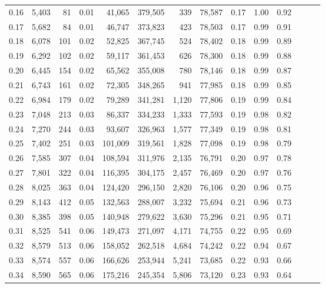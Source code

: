 \begin{tabular}{rrrrrrrrrrrrrr}
0.16 &  5,403 &     81 &  0.01 &   41,065 &  379,505 &     339 &  78,587 &  0.17 &  1.00 &      0.92 \\
0.17 &  5,682 &     84 &  0.01 &   46,747 &  373,823 &     423 &  78,503 &  0.17 &  0.99 &      0.91 \\
0.18 &  6,078 &    101 &  0.02 &   52,825 &  367,745 &     524 &  78,402 &  0.18 &  0.99 &      0.89 \\
0.19 &  6,292 &    102 &  0.02 &   59,117 &  361,453 &     626 &  78,300 &  0.18 &  0.99 &      0.88 \\
0.20 &  6,445 &    154 &  0.02 &   65,562 &  355,008 &     780 &  78,146 &  0.18 &  0.99 &      0.87 \\
0.21 &  6,743 &    161 &  0.02 &   72,305 &  348,265 &     941 &  77,985 &  0.18 &  0.99 &      0.85 \\
0.22 &  6,984 &    179 &  0.02 &   79,289 &  341,281 &   1,120 &  77,806 &  0.19 &  0.99 &      0.84 \\
0.23 &  7,048 &    213 &  0.03 &   86,337 &  334,233 &   1,333 &  77,593 &  0.19 &  0.98 &      0.82 \\
0.24 &  7,270 &    244 &  0.03 &   93,607 &  326,963 &   1,577 &  77,349 &  0.19 &  0.98 &      0.81 \\
0.25 &  7,402 &    251 &  0.03 &  101,009 &  319,561 &   1,828 &  77,098 &  0.19 &  0.98 &      0.79 \\
0.26 &  7,585 &    307 &  0.04 &  108,594 &  311,976 &   2,135 &  76,791 &  0.20 &  0.97 &      0.78 \\
0.27 &  7,801 &    322 &  0.04 &  116,395 &  304,175 &   2,457 &  76,469 &  0.20 &  0.97 &      0.76 \\
0.28 &  8,025 &    363 &  0.04 &  124,420 &  296,150 &   2,820 &  76,106 &  0.20 &  0.96 &      0.75 \\
0.29 &  8,143 &    412 &  0.05 &  132,563 &  288,007 &   3,232 &  75,694 &  0.21 &  0.96 &      0.73 \\
0.30 &  8,385 &    398 &  0.05 &  140,948 &  279,622 &   3,630 &  75,296 &  0.21 &  0.95 &      0.71 \\
0.31 &  8,525 &    541 &  0.06 &  149,473 &  271,097 &   4,171 &  74,755 &  0.22 &  0.95 &      0.69 \\
0.32 &  8,579 &    513 &  0.06 &  158,052 &  262,518 &   4,684 &  74,242 &  0.22 &  0.94 &      0.67 \\
0.33 &  8,574 &    557 &  0.06 &  166,626 &  253,944 &   5,241 &  73,685 &  0.22 &  0.93 &      0.66 \\
0.34 &  8,590 &    565 &  0.06 &  175,216 &  245,354 &   5,806 &  73,120 &  0.23 &  0.93 &      0.64 \\

\end{tabular}
